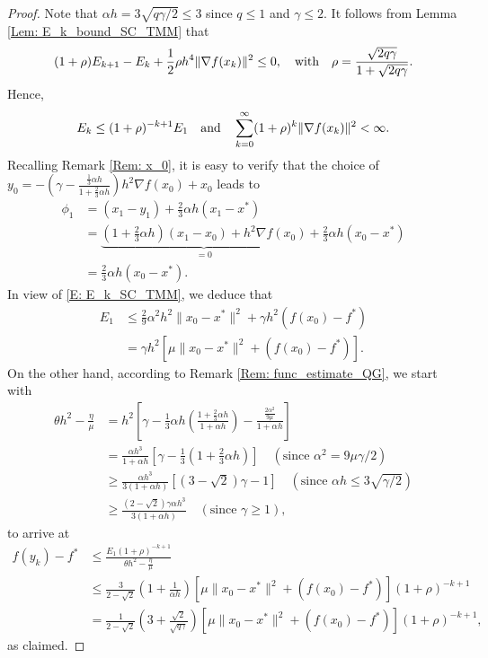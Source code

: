 \documentclass[pdflatex,sn-mathphys-num]{sn-jnl}
\theoremstyle{thmstyleone}
\theoremstyle{thmstyletwo}
\theoremstyle{thmstylethree}
\newcommand{\qbox}[1]{\quad\hbox{#1}\quad}
\begin{document}
\begin{proof}
Note that $\alpha h = 3\sqrt{q\gamma/2}\le 3$ since $q\le 1$ and $\gamma\le 2$. It follows from Lemma \ref{Lem: E_k_bound_SC_TMM} that
$$ (1 + \rho )E_{k+1} - E_k + \frac{1}{2}\rho h^4 \| \nabla f(x_k) \|^2 \le 0,\qbox{with} \rho = \frac{\sqrt{2q\gamma}}{1+\sqrt{2q\gamma}}. $$
Hence, 
$$ E_k \le (1 + \rho)^{-k+1}E_1 \qbox{and} \sum_{k=0}^\infty (1+\rho)^k \| \nabla f(x_k) \|^2 < \infty. $$
Recalling Remark \ref{Rem: x_0}, it is easy to verify that the choice of $y_0 = -\left( \gamma - \frac{ \frac{1}{3}\alpha h }{1+ \frac{2}{3}\alpha h } \right)h^2\nabla f(x_0) + x_0 $ leads to
\begin{align*}
\phi_1
&= (x_1-y_1) + \frac{2}{3}\alpha h(x_1-x^*) \\
&= \underbrace{ \left( 1 + \frac{2}{3}\alpha h \right)(x_1-x_0) + h^2 \nabla f(x_0) }_{=0}
  + \frac{2}{3}\alpha h (x_0-x^*)\\
&= \frac{2}{3}\alpha h (x_0-x^*).
\end{align*}
In view of \eqref{E: E_k_SC_TMM}, we deduce that  
\begin{align*}
E_1
&\le \frac{2}{9}\alpha^2 h^2 \| x_0 - x^* \|^2 + \gamma h^2 \left( f(x_0) - f^* \right) \\
&= \gamma h^2 \left[ \mu \| x_0 - x^* \|^2 + \left( f(x_0) - f^* \right)  \right]. 
\end{align*}
On the other hand, according to Remark \ref{Rem: func_estimate_QG}, we start with
\begin{align*}
\theta h^2 - \frac{\eta}{\mu}
&= h^2 \left[ \gamma  - \frac{1}{3}\alpha h\left( \frac{1 + \frac{2}{3}\alpha h}{1+\alpha h} \right) -  \frac{\frac{2\alpha^2}{9\mu}}{1 + \alpha h } \right] \\
&= \frac{\alpha h^3}{1+\alpha h} \left[ \gamma - \frac{1}{3}\left( 1 + \frac{2}{3}\alpha h \right) \right]\quad (\text{since } \alpha^2 = 9\mu\gamma/2 ) \\
&\ge \frac{\alpha h^3}{3(1+\alpha h)}\left[ (3-\sqrt{2})\gamma-1 \right] \quad (\text{since }\alpha h \le 3\sqrt{\gamma/2} )\\
&\ge \frac{(2-\sqrt{2})\gamma\alpha h^3}{3(1+\alpha h)} \quad (\text{since }\gamma\ge 1 ),
\end{align*}
to arrive at
\begin{align*}
f(y_k) - f^*  
&\le \frac{E_1 (1+\rho)^{-k+1}}{\theta h^2 - \frac{\eta}{\mu} } \\ 
&\le \frac{3}{2-\sqrt{2}} \left( 1 + \frac{1}{\alpha h} \right) \left[ \mu \| x_0 - x^* \|^2 + \left( f(x_0) - f^* \right)  \right] (1+\rho)^{-k+1} \\
&= \frac{1}{2-\sqrt{2}} \left( 3 + \frac{\sqrt{2}}{\sqrt{q\gamma}} \right) \left[ \mu \| x_0 - x^* \|^2 + \left( f(x_0) - f^* \right)  \right] (1+\rho)^{-k+1}, 
\end{align*}
as claimed.
\end{proof}
\end{document}
